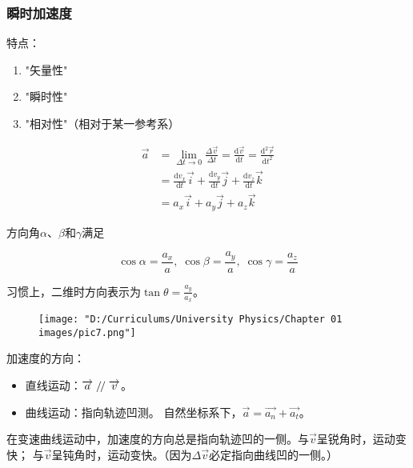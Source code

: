 \documentclass[12pt, a4paper]{article}
\newcommand{\rmd}{\mathrm{d}}
\renewcommand{\parallel}{\mathrel{/\mskip-2.5mu/}}
\begin{document}
\subsubsection{瞬时加速度}

    特点：

    \begin{enumerate}
        \item {\color{Thistle}"矢量性"}
        \item {\color{Thistle}"瞬时性"}
        \item {\color{Thistle}"相对性"}（相对于某一参考系）
    \end{enumerate}

    \begin{align*}
    \overrightarrow{a} &= \lim_{\Delta t \rightarrow 0} \frac{\Delta \overrightarrow{v}}{\Delta t}
    = \frac{\rmd \overrightarrow{v}}{\rmd t} =
    \frac{\rmd^2 \overrightarrow{r}}{\rmd t^2}
    \\
    &= \frac{\rmd v_{x}}{\rmd t} \overrightarrow{i} +
    \frac{\rmd v_{y}}{\rmd t} \overrightarrow{j} +
    \frac{\rmd v_{z}}{\rmd t} \overrightarrow{k}
    \\
    &= a_{x}\overrightarrow{i} + a_{y}\overrightarrow{j}
    + a_{z}\overrightarrow{k}
    \end{align*}

    方向角\(\alpha\)、\(\beta\)和\(\gamma\)满足

    \[
        \cos \alpha = \frac{a_x}{a},\; \cos \beta = \frac{a_y}{a}, \;\cos \gamma = \frac{a_z}{a}
    \]

    习惯上，二维时方向表示为\(\tan \theta = \frac{a_y}{a_x}\)。
    
    \begin{wrapfigure}{r}{4cm}
        \centering
        \texttt{[image: "D:/Curriculums/University Physics/Chapter 01 images/pic7.png"]}
        \label{pic7}
    \end{wrapfigure}

    加速度的方向：

    \begin{itemize}
        \item 直线运动：\(\overrightarrow{a} \parallel \overrightarrow{v}\)。
        \item 曲线运动：指向轨迹凹测。
            自然坐标系下，\(\overrightarrow{a} = \overrightarrow{a_{n}} + \overrightarrow{a_{t}}\)。
    \end{itemize}

    在变速曲线运动中，加速度的方向总是指向轨迹凹的一侧。与\(\overrightarrow{v}\)呈锐角时，运动变快；
    与\(\overrightarrow{v}\)呈钝角时，运动变快。（因为\(\Delta \overrightarrow{v}\)必定指向曲线凹的一侧。）
\end{document}
